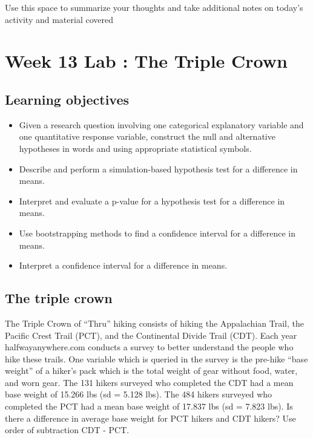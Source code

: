 \documentclass[
]{report}
\begin{document}
Use this space to summarize your thoughts and take additional notes on today's activity and material covered

\newpage

\hypertarget{week-13-lab-the-triple-crown}{%
\section{Week 13 Lab : The Triple Crown}\label{week-13-lab-the-triple-crown}}


\hypertarget{learning-objectives-21}{%
\subsection{Learning objectives}\label{learning-objectives-21}}

\begin{itemize}
\item
  Given a research question involving one categorical explanatory variable and one quantitative response variable, construct the null and alternative hypotheses
  in words and using appropriate statistical symbols.
\item
  Describe and perform a simulation-based hypothesis test for a difference in means.
\item
  Interpret and evaluate a p-value for a hypothesis test for a difference in means.
\item
  Use bootstrapping methods to find a confidence interval for a difference in means.
\item
  Interpret a confidence interval for a difference in means.
\end{itemize}

\hypertarget{the-triple-crown}{%
\subsection{The triple crown}\label{the-triple-crown}}

The Triple Crown of ``Thru'' hiking consists of hiking the Appalachian Trail, the Pacific Crest Trail (PCT), and the Continental Divide Trail (CDT). Each year halfwayanywhere.com conducts a survey to better understand the people who hike these trails. One variable which is queried in the survey is the pre-hike ``base weight'' of a hiker's pack which is the total weight of gear without food, water, and worn gear. The 131 hikers surveyed who completed the CDT had a mean base weight of 15.266 lbs (sd = 5.128 lbs). The 484 hikers surveyed who completed the PCT had a mean base weight of 17.837 lbs (sd = 7.823 lbs). Is there a difference in average base weight for PCT hikers and CDT hikers? Use order of subtraction CDT - PCT.
\end{document}
